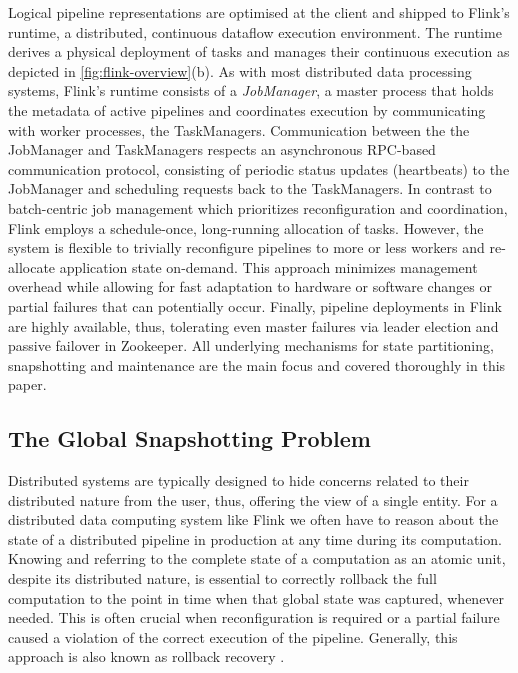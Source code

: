 Logical pipeline representations are optimised at the client and shipped to Flink's runtime, a distributed, continuous dataflow execution environment. The runtime derives a physical deployment of tasks and manages their continuous execution as depicted in \autoref{fig:flink-overview}(b). As with most distributed data processing systems, Flink's runtime consists of a \emph{JobManager}, a master process that holds the metadata of active pipelines and coordinates execution by communicating with worker processes, the TaskManagers. Communication between the the JobManager and TaskManagers respects an asynchronous RPC-based communication protocol, consisting of periodic status updates (heartbeats) to the JobManager and scheduling requests back to the TaskManagers. In contrast to batch-centric job management \cite{zaharia2012discretized,venkataramandrizzle} which prioritizes reconfiguration and coordination, Flink employs a schedule-once, long-running allocation of tasks. However, the system is flexible to trivially reconfigure pipelines to more or less workers and re-allocate application state on-demand. This approach minimizes management overhead while allowing for fast adaptation to hardware or software changes or partial failures that can potentially occur. Finally, pipeline deployments in Flink are highly available, thus, tolerating even master failures via leader election and passive failover in Zookeeper. All underlying mechanisms for state partitioning, snapshotting and maintenance are the main focus and covered thoroughly in this paper.


\subsection{The Global Snapshotting Problem}

Distributed systems are typically designed to hide concerns related to their distributed nature from the user, thus, offering the view of a single entity. For a distributed data computing system like Flink we often have to reason about the state of a distributed pipeline in production at any time during its computation. Knowing and referring to the complete state of a computation as an atomic unit, despite its distributed nature, is essential to correctly rollback the full computation to the point in time when that global state was captured, whenever needed. This is often crucial when reconfiguration is required or a partial failure caused a violation of the correct execution of the pipeline. Generally, this approach is also known as rollback recovery \cite{elnozahy2002survey}. 


